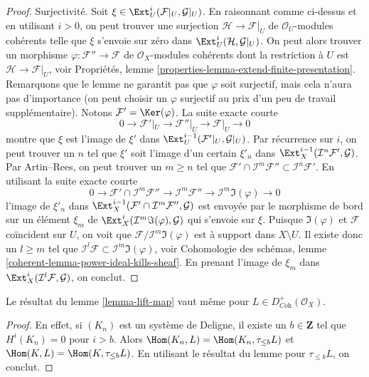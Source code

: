 \begin{proof}
\medskip\noindent
Surjectivité. Soit $\xi \in \Ext^i_U(\mathcal{F}|_U, \mathcal{G}|_U)$. En raisonnant comme ci-dessus et en utilisant $i > 0$, on peut trouver une surjection $\mathcal{H} \to \mathcal{F}|_U$ de $\mathcal{O}_U$-modules cohérents telle que $\xi$ s'envoie sur zéro dans $\Ext^i_U(\mathcal{H}, \mathcal{G}|_U)$. On peut alors trouver un morphisme $\varphi : \mathcal{F}'' \to \mathcal{F}$ de $\mathcal{O}_X$-modules cohérents dont la restriction à $U$ est $\mathcal{H} \to \mathcal{F}|_U$, voir Propriétés, lemme \ref{properties-lemma-extend-finite-presentation}. Remarquons que le lemme ne garantit pas que $\varphi$ soit surjectif, mais cela n'aura pas d'importance (on peut choisir un $\varphi$ surjectif au prix d'un peu de travail supplémentaire). Notons $\mathcal{F}' = \Ker(\varphi)$. La suite exacte courte
$$
0 \to \mathcal{F}'|_U \to \mathcal{F}''|_U \to \mathcal{F}|_U \to 0
$$
montre que $\xi$ est l'image de $\xi'$ dans $\Ext^{i - 1}_U(\mathcal{F}'|_U, \mathcal{G}|_U)$. Par récurrence sur $i$, on peut trouver un $n$ tel que $\xi'$ soit l'image d'un certain $\xi'_n$ dans $\Ext^{i - 1}_X(\mathcal{I}^n\mathcal{F}', \mathcal{G})$. Par Artin–Rees, on peut trouver un $m \geq n$ tel que $\mathcal{F}' \cap \mathcal{I}^m\mathcal{F}'' \subset
\mathcal{I}^n\mathcal{F}'$. En utilisant la suite exacte courte
$$
0 \to \mathcal{F}' \cap \mathcal{I}^m\mathcal{F}'' \to
\mathcal{I}^m\mathcal{F}'' \to \mathcal{I}^m\Im(\varphi) \to 0
$$
l'image de $\xi'_n$ dans
$\Ext^{i - 1}_X(\mathcal{F}' \cap \mathcal{I}^m\mathcal{F}'', \mathcal{G})$
est envoyée par le morphisme de bord sur un élément $\xi_m$ de $\Ext^i_X(\mathcal{I}^m\Im(\varphi), \mathcal{G})$ qui s'envoie sur $\xi$. Puisque $\Im(\varphi)$ et $\mathcal{F}$ coïncident sur $U$, on voit que $\mathcal{F}/\mathcal{I}^m\Im(\varphi)$ est à support dans $X \setminus U$. Il existe donc un $l \geq m$ tel que $\mathcal{I}^l\mathcal{F} \subset \mathcal{I}^m\Im(\varphi)$, voir Cohomologie des schémas, lemme \ref{coherent-lemma-power-ideal-kills-sheaf}. En prenant l'image de $\xi_m$ dans $\Ext^i_X(\mathcal{I}^l\mathcal{F}, \mathcal{G})$, on conclut.
\end{proof}

\begin{lemma}
\label{lemma-lift-map-plus}
Le résultat du lemme \ref{lemma-lift-map} vaut même pour $L \in D^+_{\textit{Coh}}(\mathcal{O}_X)$.
\end{lemma}

\begin{proof}
En effet, si $(K_n)$ est un système de Deligne, il existe un $b \in \mathbf{Z}$ tel que $H^i(K_n) = 0$ pour $i > b$. Alors $\Hom(K_n, L) = \Hom(K_n, \tau_{\leq b}L)$ et $\Hom(K, L) = \Hom(K, \tau_{\leq b}L)$. En utilisant le résultat du lemme pour $\tau_{\leq b}L$, on conclut.
\end{proof}

